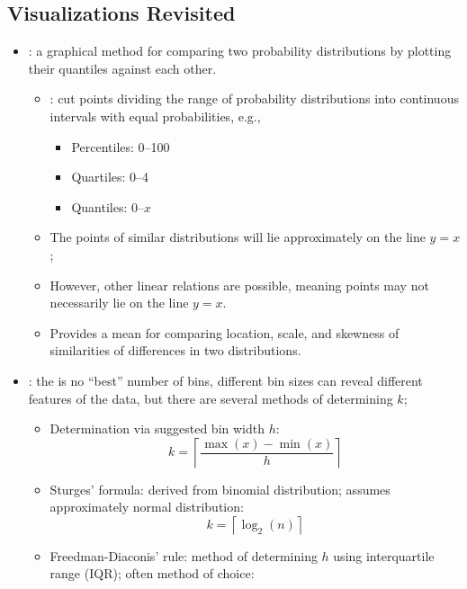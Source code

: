 \begin{itemize}
  \subsection{Visualizations Revisited}
  \begin{itemize}
    \item {}: a graphical method for comparing two probability distributions by plotting their quantiles against each other. 
      \begin{itemize}
        \item {}: cut points dividing the range of probability distributions into continuous intervals with equal probabilities, e.g.,
          \begin{itemize}
            \item Percentiles: 0--100
            \item Quartiles: 0--4
            \item Quantiles: 0--\(x\)
          \end{itemize}
        \item The points of similar distributions will lie approximately on the line \(y=x\); 
        \item However, other linear relations are possible, meaning points may not necessarily lie on the line \(y=x\).
        \item Provides a mean for comparing location, scale, and skewness of similarities of differences in two distributions.
      \end{itemize}
    \item {}: the is no ``best'' number of bins, different bin sizes can reveal different features of the data, but there are several methods of determining \(k\);
      \begin{itemize}
        \item Determination via suggested bin width \(h\):
        \[%
        k = \left\lceil \frac{\max(x) - \min(x)}{h} \right\rceil
        \]%
        \item Sturges' formula: derived from binomial distribution; assumes approximately normal distribution:
        \[%
        k = \left\lceil \log_2(n) \right\rceil
        \]%
        \item Freedman-Diaconis' rule: method of determining \(h\) using interquartile range (IQR); often method of choice:

\end{itemize}
\end{itemize}
\end{itemize}
